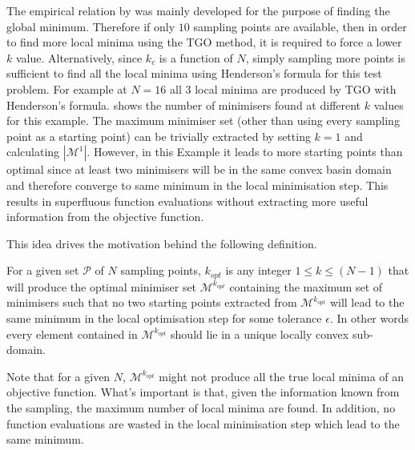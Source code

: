 The empirical relation by \citet{Henderson2015} was mainly developed for the purpose of finding the global minimum. Therefore if only $10$ sampling points are available, then in order to find more local minima using the TGO method, it is required to force a lower $k$ value. Alternatively, since $k_c$ is a function of $N$, simply sampling more points is sufficient to find all the local minima using Henderson's formula for this test problem. For example at $N=16$ all 3 local minima are produced by TGO with Henderson's formula.  shows the number of minimisers found at different $k$ values for this example. The maximum minimiser set (other than using every sampling point as a starting point) can be trivially extracted by setting $k=1$ and calculating $|\mathcal{M}^1|$. However, in this Example it leads to more starting points than optimal since at least two minimisers will be in the same convex basin domain and therefore converge to same minimum in the local minimisation step. This results in superfluous function evaluations without extracting more useful information from the objective function. 

This idea drives the motivation behind the following definition.
\begin{definition} \label{def:optpool}
For a given set $\mathcal{P}$ of $N$ sampling points, $k_{opt}$ is any integer $1 \leq k \leq (N -1)$ that will produce the optimal minimiser set $\mathcal{M}^{k_{opt}}$ containing the maximum set of minimisers such that no two starting points extracted from $\mathcal{M}^{k_{opt}}$ will lead to the same minimum in the local optimisation step for some tolerance $\epsilon$. In other words every element contained in $\mathcal{M}^{k_{opt}}$ should lie in a unique locally convex sub-domain.
\end{definition}

Note that for a given $N$, $\mathcal{M}^{k_{opt}}$ might not produce all the true local minima of an objective function. What's important is that, given the information known from the sampling, the maximum number of local minima are found. In addition, no function evaluations are wasted in the local minimisation step which lead to the same minimum.


